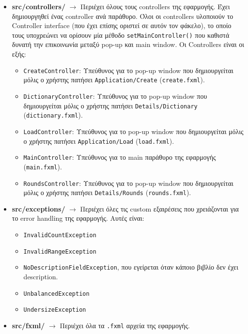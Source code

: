 \documentclass[a4paper, 12pt]{article}
\begin{document}
\begin{itemize}
			\item \textbf{src/controllers/} $\rightarrow$ Περιέχει όλους τους controllers της εφαρμογής. Έχει δημιουργηθεί ένας controller ανά παράθυρο. Όλοι οι controllers υλοποιούν το Controller interface (που έχει επίσης οριστεί σε αυτόν τον φάκελο), το οποίο τους υποχρεώνει να ορίσουν μία μέθοδο \verb|setMainController()| που καθιστά δυνατή την επικοινωνία μεταξύ pop-up και main window. Οι Controllers είναι οι εξής:
				
				\begin{itemize}
					\item \verb|CreateController|: Υπεύθυνος για το pop-up window που δημιουργείται μόλις ο χρήστης πατήσει \verb|Application/Create| (\verb|create.fxml|). 
					\item \verb|DictionaryController|: Υπεύθυνος για το pop-up window που δημιουργείται μόλις ο χρήστης πατήσει \verb|Details/Dictionary| (\verb|dictionary.fxml|).
					\item \verb|LoadController|: Υπεύθυνος για το pop-up window που δημιουργείται μόλις ο χρήστης πατήσει \verb|Application/Load| (\verb|load.fxml|).
					\item \verb|MainController|: Υπεύθυνος για το main παράθυρο της εφαρμογής (\verb|main.fxml|).
					\item \verb|RoundsController|: Υπεύθυνος για το pop-up window που δημιουργείται μόλις ο χρήστης πατήσει \verb|Details/Rounds| (\verb|rounds.fxml|).
				\end{itemize}
				
			\item \textbf{src/exceptions/} $\rightarrow$ Περιέχει όλες τις custom εξαιρέσεις που χρειάζονται για το error handling της εφαρμογής. Αυτές είναι:
				
				\begin{itemize}
					\item \verb|InvalidCountException|
					\item \verb|InvalidRangeException|
					\item \verb|NoDescriptionFieldException|, που εγείρεται όταν κάποιο βιβλίο δεν έχει description.
					\item \verb|UnbalancedException|
					\item \verb|UndersizeException|
				\end{itemize}
				
			\item \textbf{src/fxml/} $\rightarrow$ Περιέχει όλα τα \verb|.fxml| αρχεία της εφαρμογής.
	\end{itemize}
\end{document}
